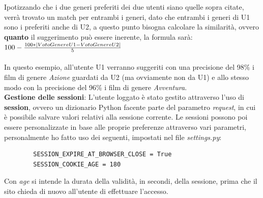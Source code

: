 \documentclass[12pt]{article}
\begin{document}
	\noindent Ipotizzando che i due generi preferiti dei due utenti siano quelle sopra citate, verrà trovato un match per entrambi i generi, dato che entrambi i generi di U1 sono i preferiti anche di U2, a questo punto bisogna calcolare la similarità, ovvero \textbf{quanto} il suggerimento può essere inerente, la formula sarà: \\
	
	$100 - {100 * |VotoGenereU1-VotoGenereU2| \over 5}$ \\ \\
	
	\noindent In questo esempio, all'utente U1 verranno suggeriti con una precisione del 98\% i film di genere \textit{Azione} guardati da U2 (ma ovviamente non da U1) e allo stesso modo con la precisione del 96\% i film di genere \textit{Avventura}. \\
	
	
	
	\noindent \textbf{Gestione delle sessioni}: L'utente loggato è stato gestito attraverso l'uso di \textbf{session}, ovvero un dizionario Python facente parte del parametro \textit{request}, in cui è possibile salvare valori relativi alla sessione corrente.
	Le sessioni possono poi essere personalizzate in base alle proprie preferenze attraverso vari parametri, personalmente ho fatto uso dei seguenti, impostati nel file \textit{settings.py}:
	\begin{verbatim}
		SESSION_EXPIRE_AT_BROWSER_CLOSE = True
		SESSION_COOKIE_AGE = 180
	\end{verbatim}
	
	\noindent Con \textit{age} si intende la durata della validità, in secondi, della sessione, prima che il sito chieda di nuovo all'utente di effettuare l'accesso. \\ \\
	
\end{document}
